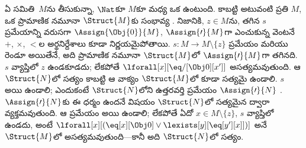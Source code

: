 \documentclass[../../../include/open-logic-section]{subfiles}
\begin{document}
\begin{explain}
ఏ  సమితి~$M$ను
తీసుకున్నా, $\Nat$కూ $M$కూ మధ్య ఒక 
ఉంటుంది. కాబట్టి అటువంటి ప్రతి $M$, ఒక ప్రామాణిక నమూనా
$\Struct{M}$కు సంభావ్య .
నిజానికి, $z\in M$ను, తగిన $s$ ప్రమేయాన్ని వరుసగా
$\Assign{\Obj{0}}{M}$, $\Assign{\prime}{M}$గా ఎంచుకున్న వెంటనే
$+$, $\times$, $<$ల అర్థనిర్దేశాలు కూడా నిర్ణయమైపోతాయి.
$s\colon M\to M\setminus\{z\}$ ప్రమేయం
 మరియు
 రెండూ అయితేనే, అది ప్రామాణిక
నమూనా $\Struct{M}$లో $\Assign{\prime}{M}$గా తగినది. $s$ వ్యాప్తిలో $z$ ఉండకూడదు;
లేకపోతే $\lforall[x][\eq/[\Obj 0][x']]$ అసత్యమవుతుంది. ఆ
 $\Struct{N}$లో సత్యం కాబట్టి
ఆ వాక్యం $\Struct{M}$లో కూడా సత్యమై ఉండాలి. $s$
 అయి ఉండాలి; ఎందుకంటే
$\Struct{N}$లోని ఉత్తరవర్తి ప్రమేయం $\Assign{\prime}{N}$
. $\Assign{\prime}{N}$కు ఈ ధర్మం ఉందనే విషయం
$\Struct{N}$లో సత్యమైన
 ద్వారా వ్యక్తమవుతుంది.
ఆ ప్రమేయం  అయి ఉండాలి; లేకపోతే
ఏదో $x\in M\setminus\{z\}$, $s$ వ్యాప్తిలో ఉండదు, అంటే
$\lforall[x][(\eq[x][\Obj 0]\lor\lexists[y][\eq[y'][x]])]$ అనే
 $\Struct{M}$లో అసత్యమవుతుంది---కానీ
అది $\Struct{N}$లో సత్యం.
\end{explain}
\end{document}
